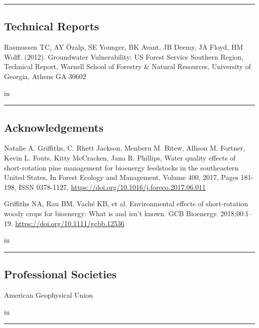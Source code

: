 \documentclass[10pt,letterpaper]{article}
\begin{document}
\hrule
\vspace{-0.4em}
\vskip 0.2in
\subsection*{Technical Reports}

\begin{hangparas}{.25in}{1}
	
	Rasmussen TC, AY \"{O}zalp, SE Younger, BK Avant, JB Deemy, JA Floyd, HM Wolff. (2012). Groundwater Vulnerability: US Forest Service Southern Region, Technical Report, Warnell School of Forestry \& Natural Resources, University of Georgia, Athens GA 30602
	
\end{hangparas}

 in

\hrule
\vspace{-0.4em}
\vskip 0.2in
\subsection*{Acknowledgements}
	
	\begin{hangparas}{.25in}{1}
		
	Natalie A. Griffiths, C. Rhett Jackson, Menberu M. Bitew, Allison M. Fortner, Kevin L. Fouts, Kitty McCracken, Jana R. Phillips, Water quality effects of short-rotation pine management for bioenergy feedstocks in the southeastern United States, In Forest Ecology and Management, Volume 400, 2017, Pages 181-198, ISSN 0378-1127, \url{https://doi.org/10.1016/j.foreco.2017.06.011}
	
	Griffiths NA, Rau BM, Vaché KB, et al. Environmental effects of short‐rotation woody crops for bioenergy: What is and isn’t known. GCB Bioenergy. 2018;00:1–19. \url{https://doi.org/10.1111/gcbb.12536}
	
	\end{hangparas}

 in

\hrule
\vspace{-0.4em}
\vskip 0.2in
\subsection*{Professional Societies}

	American Geophysical Union

 in

\hrule
\vspace{-0.4em}
\vskip 0.2in
\end{document}
